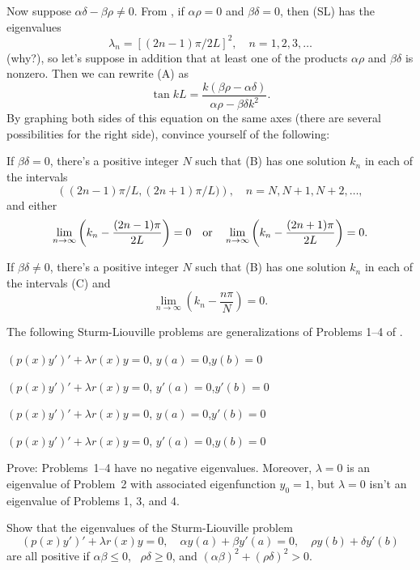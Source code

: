 \begin{exerciselist}
\begin{alist}
Now suppose $\alpha\delta-\beta\rho\ne0$. From
, if $\alpha\rho=0$ and $\beta\delta=0$,
then (SL) has the eigenvalues
\[
\lambda_{n}=[(2n-1)\pi/2L]^{2},\quad  n=1,2,3, \dots
\]
(why?), so let's suppose  in addition that at least one of the products
$\alpha\rho$ and $\beta\delta$ is nonzero.  Then we can rewrite (A)
as
\[\tag{B}
\tan kL=
\frac{k(\beta\rho-\alpha\delta)}
{\alpha\rho-\beta\delta k^{2}}.
\]
By graphing both sides of this equation on the same axes
(there are several possibilities for the right side), convince yourself of
the following:
\item If $\beta\delta=0$, there's a positive integer $N$ such that (B)
has one solution $k_{n}$ in each of the intervals
\[\tag{C}
\left((2n-1)\pi/L, (2n+1)\pi/L)\right),\quad n=N,N+1,N+2,\dots,
\]
and either
\[
\lim_{n\to\infty}\left(k_{n}-\frac{(2n-1)\pi}{2L}\right) =0
\text{\quad or\quad}
\lim_{n\to\infty}\left(k_{n}-\frac{(2n+1)\pi}{2L}\right)=0.
\]
\item
If $\beta\delta\ne0$, there's a positive integer $N$  such that (B) has
one solution $k_{n}$ in each of the intervals (C) and
\[
\lim_{n\to\infty}\left(k_{n}-\frac{n\pi}{N}\right)=0.
\]
\end{alist}

\item\label{exer:13.2.31}The following Sturm-Liouville problems are generalizations of Problems
1--4 of .
\begin{enumext}[label=\arabic*,wrap-label={Problem #1:},labelwidth=5em]
\item $(p(x)y')'+\lambda r(x)y=0$,\quad
$y(a)=0$,\quad  $y(b)=0$
\item $(p(x)y')'+\lambda r(x)y=0$,\quad
$y'(a)=0$,\quad  $y'(b)=0$
\item $(p(x)y')'+\lambda r(x)y=0$,\quad
$y(a)=0$,\quad  $y'(b)=0$
\item $(p(x)y')'+\lambda r(x)y=0$,\quad
$y'(a)=0$,\quad  $y(b)=0$
\end{enumext}

Prove: Problems~1--4 have no negative eigenvalues. Moreover, $\lambda=0$
is an eigenvalue of Problem~2 with associated eigenfunction $y_{0}=1$,
but $\lambda=0$ isn't an eigenvalue of Problems 1, 3, and 4.

\item\label{exer:13.2.32}Show that the eigenvalues of the Sturm-Liouville
problem
\[
(p(x)y')'+\lambda r(x)y=0,\quad \alpha y(a)+ \beta y'(a)=0,\quad
\rho y(b)+\delta y'(b)
\]
are all positive if $\alpha\beta\le 0$, \,  $\rho\delta\ge 0$, and
$(\alpha\beta)^{2}+(\rho\delta)^{2}>0$.

\end{exerciselist}
